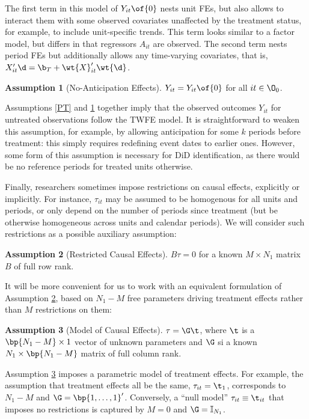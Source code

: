 \documentclass[12pt]{article}
\theoremstyle{definition}
\newtheorem{assumption}{Assumption}
\begin{document}
The first term in this model of $Y_{it}\of{0}$ nests unit FEs, but also allows to interact them with some observed covariates unaffected by the treatment status, for example, to include unit-specific trends. This term looks similar to a factor model, but differs in that regressors $A_{it}$ are observed. The second term nests period FEs but additionally allows any time-varying covariates, that is, $X_{it}^\prime \d = \b_T + \wt{X}_{it}^{\prime} \wt{\d}$.

\begin{assumption}[No-Anticipation Effects] \label{NA}
    $Y_{it} = Y_{it}\of{0}$ for all $it \in \O_0$.
\end{assumption}

Assumptions \ref{PT} and \ref{NA} together imply that the observed outcomes $Y_{it}$ for untreated observations follow the TWFE model. It is straightforward to weaken this assumption, for example, by allowing anticipation for some $k$ periods before treatment: this simply requires redefining event dates to earlier ones. However, some form of this assumption is necessary for DiD identification, as there would be no reference periods for treated units otherwise.

Finally, researchers sometimes impose restrictions on causal effects, explicitly or implicitly. For instance, $\tau_{it}$ may be assumed to be homogenous for all units and periods, or only depend on the number of periods since treatment (but be otherwise homogeneous across units and calendar periods). We will consider such restrictions as a possible auxiliary assumption:

\begin{assumption}[Restricted Causal Effects] \label{RCE}
    $B \tau = 0$ for a known $M \times N_1$ matrix $B$ of full row rank.
\end{assumption}

It will be more convenient for us to work with an equivalent formulation of Assumption \ref{RCE}, based on $N_1 - M$ free parameters driving treatment effects rather than $M$ restrictions on them:

\begin{assumption}[Model of Causal Effects] \label{MCE}
    $\tau = \G \t$, where $\t$ is a $\bp{N_1 - M} \times 1$ vector of unknown parameters and $\G$ si a known $N_1 \times \bp{N_1 - M}$ matrix of full column rank. 
\end{assumption}

Assumption \ref{MCE} imposes a parametric model of treatment effects. For example, the assumption that treatment effects all be the same, $\tau_{it} = \t_1$, corresponds to $N_1 - M$ and $\G = \bp{1, \ldots, 1}^{\prime}$. Conversely, a ``null model'' $\tau_{it} \equiv \t_{it}$ that imposes no restrictions is captured by $M=0$ and $\G = \mathbb{I}_{N_1}$.
\end{document}
